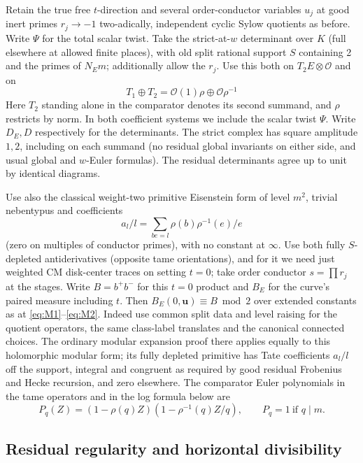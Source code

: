 Retain the true free \(t\)-direction and several order-conductor variables
\(u_j\) at good inert primes \(r_j\to-1\) two-adically, independent cyclic
Sylow quotients as before. Write \(\Psi\) for the total scalar twist. Take the
strict-at-\(w\) determinant over \(K\) (full elsewhere at allowed finite
places), with old split rational support \(S\) containing 2 and the primes of
\(N_E m\); additionally allow the \(r_j\). Use this both on
\(T_2E\otimes\mathcal O\) and on
\[
                     T_1\oplus T_2=\mathcal O(1)\rho\oplus
                                             \mathcal O\rho^{-1}
\]
Here \(T_2\) standing alone in the comparator denotes its second summand, and
\(\rho\) restricts by norm.  In both coefficient systems we include the scalar
twist \(\Psi\). Write \(D_E,D\) respectively for the determinants. The strict
complex has square amplitude \(1,2\), including on each summand (no residual
global invariants on either side, and usual global and \(w\)-Euler formulas).
The residual determinants agree up to unit by identical diagrams.

Use also the classical weight-two primitive Eisenstein form of level \(m^2\), trivial nebentypus and coefficients
\[
                        a_l/l=\sum_{b e=l}\rho(b)\rho^{-1}(e)/e
\]
(zero on multiples of conductor primes), with no constant at \(\infty\). Use
both fully \(S\)-depleted antiderivatives (opposite tame orientations), and
for it we need just weighted CM disk-center traces on setting \(t=0\); take
order conductor \(s=\prod r_j\) at the stages. Write \(B=b^+ b^-\) for this
\(t=0\) product and \(B_E\) for the curve's paired measure including \(t\).
Then \(B_E(0,\mathbf u)\equiv B\bmod2\) over extended constants as at
\eqref{eq:M1}--\eqref{eq:M2}. Indeed use common split data and level raising
for the quotient operators, the same class-label translates and the canonical
connected choices. The ordinary modular expansion proof there applies equally
to this holomorphic modular form; its fully depleted primitive has Tate
coefficients \(a_l/l\) off the support, integral and congruent as required by
good residual Frobenius and Hecke recursion, and zero elsewhere. The
comparator Euler polynomials in the tame operators and in the log formula
below are
\[
       P_q(Z)=(1-\rho(q)Z)(1-\rho^{-1}(q)Z/q),
                 \qquad P_q=1\ \text{if }q\mid m.
\]

\subsection{Residual regularity and horizontal divisibility}

